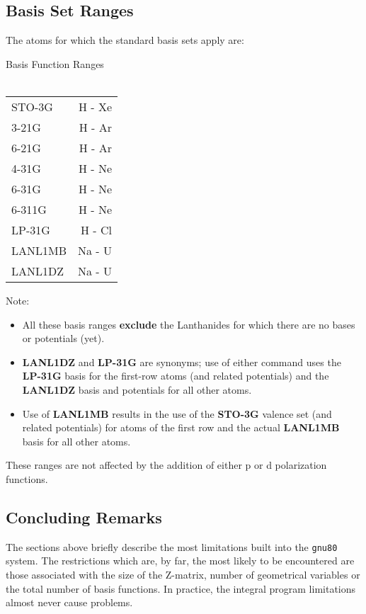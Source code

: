 \subsection{\sf Basis Set Ranges}
The atoms for which the standard basis sets apply are: \\
{\bf 
\begin{center}
Basis Function Ranges \\
\  \\
\begin{tabular}{|l|r|} \hline
STO-3G &    H - Xe \\
3-21G  &    H - Ar \\
6-21G  &    H - Ar \\
4-31G  &   H - Ne \\
6-31G  &   H - Ne \\
6-311G &  H - Ne \\
LP-31G &    H - Cl \\
LANL1MB & Na - U \\
LANL1DZ & Na - U \\
\hline
\end{tabular}
\end{center}
} %
Note:
\begin{itemize}
\item
All these basis ranges {\bf exclude} the Lanthanides for which
there are no bases or potentials (yet).
\item
{\bf LANL1DZ} and {\bf LP-31G} are synonyms; use of either command
uses the {\bf LP-31G} basis for the first-row atoms (and related potentials)
and the {\bf LANL1DZ} basis and potentials for all other atoms.
\item
Use of {\bf LANL1MB} results in the use of the {\bf STO-3G} valence set
(and related potentials) for atoms of the first row and the actual
{\bf LANL1MB} basis for all other atoms.
\end{itemize}
These ranges are not affected by the addition of either p or d polarization
functions.
\begin{center}
\end{center}
\subsection{\sf Concluding Remarks}
The  sections above briefly describe the most limitations built
into the {\tt gnu80} system. The restrictions which are, by far, the
most likely to be encountered
are those associated with the size of the Z-matrix, number of geometrical
variables or the total number of basis functions.  In practice, the integral
program limitations almost never cause problems.

